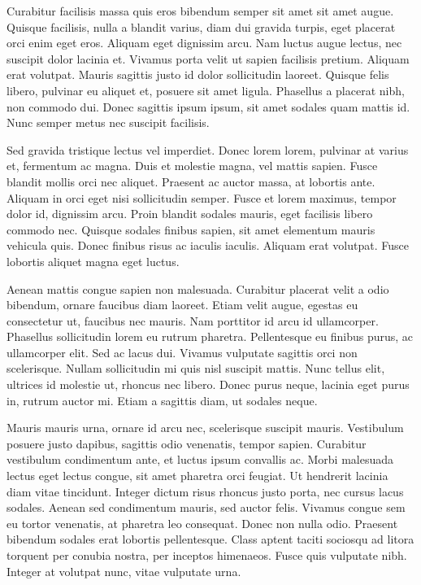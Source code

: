 \documentclass[a4paper,10pt,twoside]{article} %
\begin{document}
Curabitur facilisis massa quis eros bibendum semper sit amet sit amet augue.
Quisque facilisis, nulla a blandit varius, diam dui gravida turpis, eget placerat orci enim eget eros.
Aliquam eget dignissim arcu.
Nam luctus augue lectus, nec suscipit dolor lacinia et.
Vivamus porta velit ut sapien facilisis pretium.
Aliquam erat volutpat.
Mauris sagittis justo id dolor sollicitudin laoreet.
Quisque felis libero, pulvinar eu aliquet et, posuere sit amet ligula.
Phasellus a placerat nibh, non commodo dui.
Donec sagittis ipsum ipsum, sit amet sodales quam mattis id.
Nunc semper metus nec suscipit facilisis.

\terminateStopMotion
Sed gravida tristique lectus vel imperdiet.
Donec lorem lorem, pulvinar at varius et, fermentum ac magna.
Duis et molestie magna, vel mattis sapien.
Fusce blandit mollis orci nec aliquet.
Praesent ac auctor massa, at lobortis ante.
Aliquam in orci eget nisi sollicitudin semper.
Fusce et lorem maximus, tempor dolor id, dignissim arcu.
Proin blandit sodales mauris, eget facilisis libero commodo nec.
Quisque sodales finibus sapien, sit amet elementum mauris vehicula quis.
Donec finibus risus ac iaculis iaculis.
Aliquam erat volutpat.
Fusce lobortis aliquet magna eget luctus.

Aenean mattis congue sapien non malesuada.
Curabitur placerat velit a odio bibendum, ornare faucibus diam laoreet.
Etiam velit augue, egestas eu consectetur ut, faucibus nec mauris.
Nam porttitor id arcu id ullamcorper.
Phasellus sollicitudin lorem eu rutrum pharetra.
Pellentesque eu finibus purus, ac ullamcorper elit.
Sed ac lacus dui.
Vivamus vulputate sagittis orci non scelerisque.
Nullam sollicitudin mi quis nisl suscipit mattis.
Nunc tellus elit, ultrices id molestie ut, rhoncus nec libero.
Donec purus neque, lacinia eget purus in, rutrum auctor mi.
Etiam a sagittis diam, ut sodales neque.

Mauris mauris urna, ornare id arcu nec, scelerisque suscipit mauris.
Vestibulum posuere justo dapibus, sagittis odio venenatis, tempor sapien.
Curabitur vestibulum condimentum ante, et luctus ipsum convallis ac.
Morbi malesuada lectus eget lectus congue, sit amet pharetra orci feugiat.
Ut hendrerit lacinia diam vitae tincidunt.
Integer dictum risus rhoncus justo porta, nec cursus lacus sodales.
Aenean sed condimentum mauris, sed auctor felis.
Vivamus congue sem eu tortor venenatis, at pharetra leo consequat.
Donec non nulla odio.
Praesent bibendum sodales erat lobortis pellentesque.
Class aptent taciti sociosqu ad litora torquent per conubia nostra, per inceptos himenaeos.
Fusce quis vulputate nibh.
Integer at volutpat nunc, vitae vulputate urna.
\end{document}
